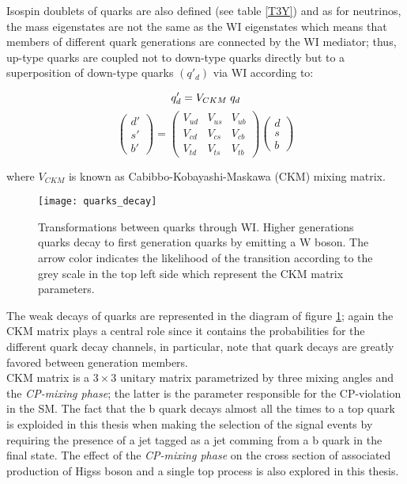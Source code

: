 \noindent Isospin doublets of quarks are also defined (see table \ref{T3Y}) and as for neutrinos, the mass eigenstates are not the same as the WI eigenstates which means that members of different quark generations are connected by the WI mediator; thus, up-type quarks are coupled not to down-type quarks directly but to a superposition of down-type quarks $(q'_d)$ via WI according to: 

$$q'_d = V_{CKM}\hspace{0.1cm}q_d$$
\begin{equation}
\begin{pmatrix}d'\\ s'\\ b'\end{pmatrix}=\begin{pmatrix} V_{ud} & V_{us} & V_{ub}\\ V_{cd} & V_{cs} & V_{cb}\\ V_{td} & V_{ts} & V_{tb}\end{pmatrix}\begin{pmatrix}d\\s\\b\end{pmatrix}
\label{eq:qmixing}
\end{equation}

\noindent where $V_{CKM}$ is known as Cabibbo-Kobayashi-Maskawa (CKM) mixing matrix\cite{C,KM}. 

\begin{figure}[!h]
  \centering
  \texttt{[image: quarks\_decay]}
  \caption[WI transformations between quarks]{Transformations between quarks through WI. Higher generations quarks decay to first generation quarks by emitting a W boson. The arrow color indicates the likelihood of the transition according to the grey scale in the top left side which represent the CKM matrix parameters\cite{ckm}.}
  \label{quarks_decay}
\end{figure}

\noindent The weak decays of quarks are represented in the diagram of figure \ref{quarks_decay}; again the CKM matrix plays a central role since it contains the probabilities for the different quark decay channels, in particular, note that quark decays are greatly favored between generation members.\\

\noindent CKM matrix is a $3\times3$ unitary matrix parametrized by three mixing angles and the \textit{CP-mixing phase}; the latter is the parameter responsible for the CP-violation in the SM. The fact that the b quark decays almost all the times to a top quark is exploided in this thesis when making the selection of the signal events by requiring the presence of a jet tagged as a jet comming from a b quark in the final state. The effect of the \textit{CP-mixing phase} on the cross section of associated production of Higss boson and a single top process is also explored in this thesis.    

